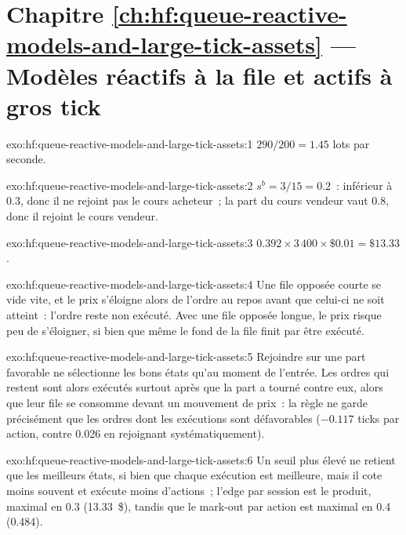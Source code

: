 \section*{Chapitre \ref{ch:hf:queue-reactive-models-and-large-tick-assets} --- Modèles réactifs à la file et actifs à gros tick}

\begin{solution}{exo:hf:queue-reactive-models-and-large-tick-assets:1}
$290/200=1.45$ lots par seconde.
\end{solution}

\begin{solution}{exo:hf:queue-reactive-models-and-large-tick-assets:2}
$s^b=3/15=0.2$~: inférieur à 0.3, donc il ne rejoint pas le cours acheteur~; la part du cours vendeur vaut 0.8, donc il rejoint le cours vendeur.
\end{solution}

\begin{solution}{exo:hf:queue-reactive-models-and-large-tick-assets:3}
$0.392\times3\,400\times\$0.01=\$13.33$.
\end{solution}

\begin{solution}{exo:hf:queue-reactive-models-and-large-tick-assets:4}
Une file opposée courte se vide vite, et le prix s'éloigne alors de l'ordre au repos avant que celui-ci ne soit atteint~: l'ordre reste non exécuté.
Avec une file opposée longue, le prix risque peu de s'éloigner, si bien que même le fond de la file finit par être exécuté.
\end{solution}

\begin{solution}{exo:hf:queue-reactive-models-and-large-tick-assets:5}
Rejoindre sur une part favorable ne sélectionne les bons états qu'au moment de l'entrée. Les ordres qui restent sont alors exécutés surtout après que la part a
tourné contre eux, alors que leur file se consomme devant un mouvement de prix~: la règle ne garde précisément que les ordres dont les exécutions sont défavorables
($-0.117$ ticks par action, contre 0.026 en rejoignant systématiquement).
\end{solution}

\begin{solution}{exo:hf:queue-reactive-models-and-large-tick-assets:6}
Un seuil plus élevé ne retient que les meilleurs états, si bien que chaque exécution est meilleure, mais il cote moins souvent et exécute moins d'actions~; l'edge par session est
le produit, maximal en 0.3 (13.33~\$), tandis que le mark-out par action est maximal en 0.4 (0.484).
\end{solution}

